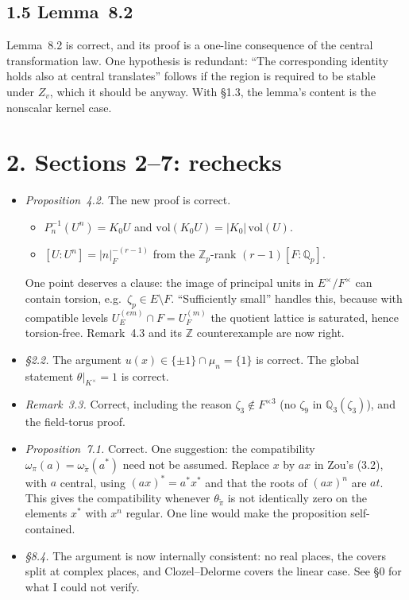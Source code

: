 \documentclass[11pt]{article}
\begin{document}
\subsection*{1.5 Lemma~8.2}
Lemma~8.2 is correct, and its proof is a one-line consequence of the
central transformation law. One hypothesis is redundant: ``The
corresponding identity holds also at central translates'' follows if
the region is required to be stable under $Z_v$, which it should be
anyway. With \S1.3, the lemma's content is the nonscalar kernel case.

\section*{2. Sections 2--7: rechecks}
\begin{itemize}
\item \emph{Proposition~4.2.} The new proof is correct.
\begin{itemize}
\item $P_n^{-1}(U^n)=K_0U$ and $\mathrm{vol}(K_0U)=|K_0|\,\mathrm{vol}(U)$.
\item $[U:U^n]=|n|_F^{-(r-1)}$ from the $\mathbb Z_p$-rank
$(r-1)[F:\mathbb Q_p]$.
\end{itemize}
One point deserves a clause: the image of principal units in
$E^\times/F^\times$ can contain torsion, e.g.\ $\zeta_p\in E\setminus F$.
``Sufficiently small'' handles this, because with compatible levels
$U_E^{(em)}\cap F=U_F^{(m)}$ the quotient lattice is saturated, hence
torsion-free. Remark~4.3 and its $\mathbb Z$ counterexample are now
right.
\item \emph{\S2.2.} The argument $u(x)\in\{\pm1\}\cap\mu_n=\{1\}$ is
correct. The global statement $\theta|_{K^\times}=1$ is correct.
\item \emph{Remark~3.3.} Correct, including the reason
$\zeta_3\notin F^{\times3}$ (no $\zeta_9$ in $\mathbb Q_3(\zeta_3)$),
and the field-torus proof.
\item \emph{Proposition~7.1.} Correct. One suggestion: the compatibility
$\omega_\pi(a)=\omega_{\widetilde\pi}(a^*)$ need not be assumed.
Replace $x$ by $ax$ in Zou's (3.2), with $a$ central, using
$(ax)^*=a^*x^*$ and that the roots of $(ax)^n$ are $at$. This gives
the compatibility whenever $\theta_{\widetilde\pi}$ is not identically
zero on the elements $x^*$ with $x^n$ regular. One line would make the
proposition self-contained.
\item \emph{\S8.4.} The argument is now internally consistent: no real
places, the covers split at complex places, and Clozel--Delorme covers
the linear case. See \S0 for what I could not verify.
\end{itemize}
\end{document}
